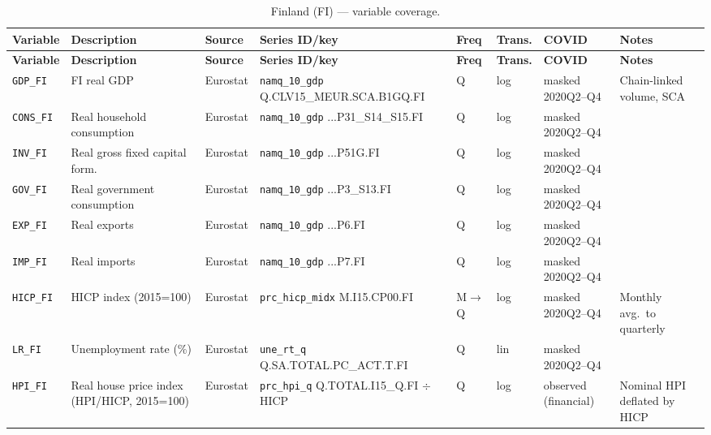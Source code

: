 {\footnotesize
\begin{longtable}{@{}p{1.9cm}p{2.9cm}p{1.5cm}p{2.7cm}p{0.7cm}p{1.0cm}p{1.6cm}p{2.4cm}@{}}
\caption{Finland (FI) --- variable coverage.}\label{tab:data:FI}\\
\toprule
\textbf{Variable} & \textbf{Description} & \textbf{Source} & \textbf{Series ID/key} & \textbf{Freq} & \textbf{Trans.} & \textbf{COVID} & \textbf{Notes} \\
\midrule \endfirsthead
\toprule
\textbf{Variable} & \textbf{Description} & \textbf{Source} & \textbf{Series ID/key} & \textbf{Freq} & \textbf{Trans.} & \textbf{COVID} & \textbf{Notes} \\
\midrule \endhead
\bottomrule \endfoot
\texttt{GDP\_FI}      & FI real GDP                       & Eurostat & \texttt{namq\_10\_gdp} Q.\allowbreak CLV15\_MEUR.\allowbreak SCA.\allowbreak B1GQ.\allowbreak FI       & Q & log & masked 2020Q2--Q4 & Chain-linked volume, SCA \\
\texttt{CONS\_FI}     & Real household consumption        & Eurostat & \texttt{namq\_10\_gdp} ...P31\_S14\_S15.FI             & Q & log & masked 2020Q2--Q4 & \\
\texttt{INV\_FI}      & Real gross fixed capital form.    & Eurostat & \texttt{namq\_10\_gdp} ...P51G.FI                      & Q & log & masked 2020Q2--Q4 & \\
\texttt{GOV\_FI}      & Real government consumption       & Eurostat & \texttt{namq\_10\_gdp} ...P3\_S13.FI                   & Q & log & masked 2020Q2--Q4 & \\
\texttt{EXP\_FI}      & Real exports                      & Eurostat & \texttt{namq\_10\_gdp} ...P6.FI                        & Q & log & masked 2020Q2--Q4 & \\
\texttt{IMP\_FI}      & Real imports                      & Eurostat & \texttt{namq\_10\_gdp} ...P7.FI                        & Q & log & masked 2020Q2--Q4 & \\
\texttt{HICP\_FI}     & HICP index (2015=100)             & Eurostat & \texttt{prc\_hicp\_midx} M.I15.CP00.FI                 & M$\to$Q & log & masked 2020Q2--Q4 & Monthly avg.\ to quarterly \\
\texttt{LR\_FI}       & Unemployment rate (\%)            & Eurostat & \texttt{une\_rt\_q} Q.SA.TOTAL.PC\_ACT.T.FI            & Q & lin & masked 2020Q2--Q4 & \\
\texttt{HPI\_FI}      & Real house price index (HPI/HICP, 2015=100) & Eurostat & \texttt{prc\_hpi\_q} Q.TOTAL.I15\_Q.FI $\div$ HICP & Q & log & observed (financial) & Nominal HPI deflated by HICP \\

\end{longtable}}
